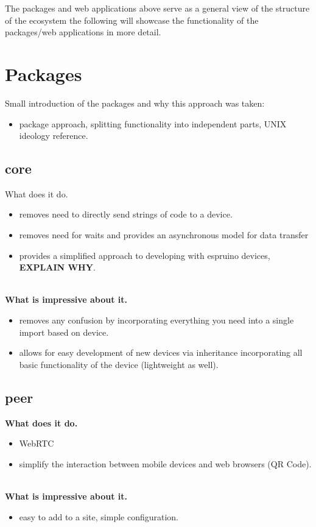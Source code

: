 \documentclass{l4proj}
\begin{document}
The packages and web applications above serve as a general view of the structure of the ecosystem the following will showcase the functionality of the packages/web applications in more detail.

\section{Packages}
Small introduction of the packages and why this approach was taken:

\begin{itemize}
    \item package approach, splitting functionality into independent parts, UNIX ideology reference.
\end{itemize}

\subsection{core}

\text What does it do.
\begin{itemize}
    \item removes need to directly send strings of code to a device.
    \item removes need for waits and provides an asynchronous model for data transfer
    \item provides a simplified approach to developing with espruino devices, \textbf{EXPLAIN WHY}.
\end{itemize}
\\
\textbf{What is impressive about it.} 
\begin{itemize}
    \item removes any confusion by incorporating everything you need into a single import based on device.
    \item allows for easy development of new devices via inheritance incorporating all basic functionality of the device (lightweight as well).
\end{itemize}
\subsection{peer}

\textbf{What does it do.}
\begin{itemize}
    \item WebRTC
    \item simplify the interaction between mobile devices and web browsers (QR Code).
\end{itemize}
\\
\textbf{What is impressive about it.}
\begin{itemize}
    \item easy to add to a site, simple configuration.
\end{itemize}
\end{document}
